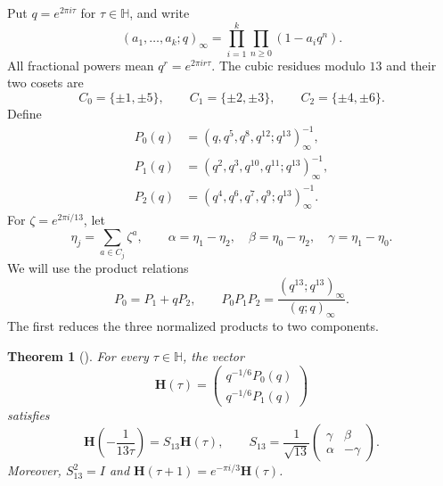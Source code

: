 \documentclass[11pt,reqno]{amsart}
\newtheorem{theorem}{Theorem}[section]
\theoremstyle{remark}
\numberwithin{equation}{section}
\newcommand{\HH}{\mathbb H}
\begin{document}
Put $q=e^{2\pi i\tau}$ for $\tau\in\HH$, and write
\[
 (a_1,\ldots,a_k;q)_\infty
 =\prod_{i=1}^k\prod_{n\geq0}(1-a_iq^n).
\]
All fractional powers mean $q^r=e^{2\pi i r\tau}$. The cubic residues modulo
$13$ and their two cosets are
\begin{equation}\label{eq:cosets}
 C_0=\{\pm1,\pm5\},\qquad C_1=\{\pm2,\pm3\},\qquad
 C_2=\{\pm4,\pm6\}.
\end{equation}
Define
\begin{equation}\label{eq:products}
\begin{aligned}
 P_0(q)&=(q,q^5,q^8,q^{12};q^{13})_\infty^{-1},\\
 P_1(q)&=(q^2,q^3,q^{10},q^{11};q^{13})_\infty^{-1},\\
 P_2(q)&=(q^4,q^6,q^7,q^9;q^{13})_\infty^{-1}.
\end{aligned}
\end{equation}
For $\zeta=e^{2\pi i/13}$, let
\begin{equation}\label{eq:perioddefs}
 \eta_j=\sum_{a\in C_j}\zeta^a,\qquad
 \alpha=\eta_1-\eta_2,\quad \beta=\eta_0-\eta_2,\quad
 \gamma=\eta_1-\eta_0.
\end{equation}
We will use the product relations \cite[Lemma~2.1]{FrickeCompanion}
\begin{equation}\label{eq:theta}
 P_0=P_1+qP_2,\qquad
 P_0P_1P_2=\frac{(q^{13};q^{13})_\infty}{(q;q)_\infty}.
\end{equation}
The first reduces the three normalized products to two components.

\begin{theorem}[{\cite[Theorem~1.1]{FrickeCompanion}}]\label{thm:main}
For every $\tau\in\HH$, the vector
\[
 \mathbf H(\tau)=
 \begin{pmatrix}q^{-1/6}P_0(q)\\q^{-1/6}P_1(q)\end{pmatrix}
\]
satisfies
\begin{equation}\label{eq:main}
 \mathbf H\!\left(-\frac1{13\tau}\right)=S_{13}\mathbf H(\tau),
 \qquad
 S_{13}=\frac1{\sqrt{13}}
 \begin{pmatrix}\gamma&\beta\\\alpha&-\gamma\end{pmatrix}.
\end{equation}
Moreover, $S_{13}^2=I$ and
$\mathbf H(\tau+1)=e^{-\pi i/3}\mathbf H(\tau)$.
\end{theorem}
\end{document}

